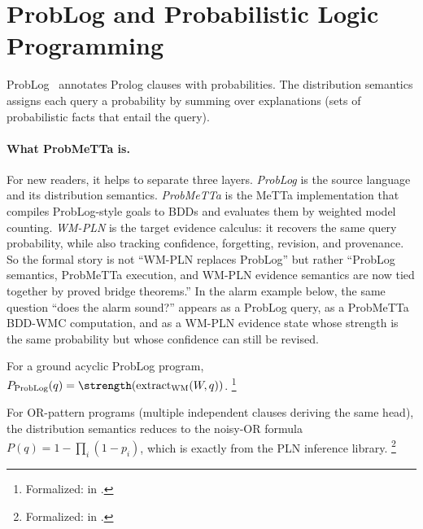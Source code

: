 \documentclass[11pt,openany]{report}
\begin{document}
\section{ProbLog and Probabilistic Logic Programming}
\label{sec:bridge-problog}

ProbLog~\cite{DeRaedt2007ProbLog} annotates Prolog clauses with
probabilities.  The distribution semantics assigns each query a
probability by summing over explanations (sets of probabilistic
facts that entail the query).

\paragraph{What ProbMeTTa is.}
For new readers, it helps to separate three layers.  \emph{ProbLog} is the
source language and its distribution semantics.  \emph{ProbMeTTa} is the
MeTTa implementation that compiles ProbLog-style goals to BDDs and evaluates
them by weighted model counting.  \emph{WM-PLN} is the target evidence
calculus: it recovers the same query probability, while also tracking
confidence, forgetting, revision, and provenance.  So the formal story is not
``WM-PLN replaces ProbLog'' but rather ``ProbLog semantics, ProbMeTTa
execution, and WM-PLN evidence semantics are now tied together by proved bridge
theorems.''  In the alarm example below, the same question
``does the alarm sound?'' appears as a ProbLog query, as a ProbMeTTa
BDD-WMC computation, and as a WM-PLN evidence state whose strength is the
same probability but whose confidence can still be revised.

\begin{theorem}[ProbLog probability = WM strength (\claimConditional{})]
\label{thm:problog-wm-strength}
For a ground acyclic ProbLog program,
$P_{\mathrm{ProbLog}}(q) =
\strength(\mathrm{extract}_{\mathrm{WM}}(W, q))$.%
\footnote{Formalized:
in .}
\end{theorem}

\noindent
For OR-pattern programs (multiple independent clauses deriving the
same head), the distribution semantics reduces to the noisy-OR
formula $P(q) = 1 - \prod_i (1 - p_i)$, which is exactly
 from the PLN inference library.%
\footnote{Formalized:
 in
.}
\end{document}
